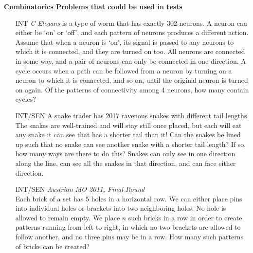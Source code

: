 \documentclass[11pt]{article}
\begin{document}
\begin{center}
\textbf{Combinatorics Problems that could be used in tests}
\end{center}

\begin{enumerate}

\item [INT] \textit{C Elegans} is a type of worm that has exactly 302 neurons. A neuron can either be `on' or `off', and each pattern of neurons produces a different action. Assume that when a neuron is `on', its signal is passed to any neurons to which it is connected, and they are turned on too. All neurons are connected in some way, and a pair of neurons can only be connected in one direction. A cycle occurs when a path can be followed from a neuron by turning on a neuron to which it is connected, and so on, until the original neuron is turned on again. Of the patterns of connectivity among 4 neurons, how many contain cycles?

\item [INT/SEN] A snake trader has 2017 ravenous snakes with different tail lengths. The snakes are well-trained and will stay still once placed, but each will eat any snake it can see that has a shorter tail than it! Can the snakes be lined up such that no snake can see another snake with a shorter tail length? If so, how many ways are there to do this? Snakes can only see in one direction along the line, can see all the snakes in that direction, and can face either direction. 	

\item [INT/SEN] \textit{Austrian MO 2011, Final Round} \\ Each brick of a set has 5 holes in a horizontal row. We can either place pins into individual holes or brackets into two neighboring holes. No hole is allowed to remain empty. We place $n$ such bricks in a row in order to create patterns running from left to right, in which no two brackets are allowed to follow another, and no three pins may be in a row. How many such patterns of bricks can be created?
\end{enumerate}
\end{document}
